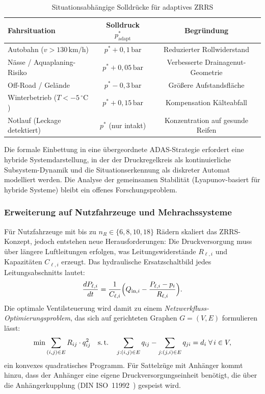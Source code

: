 ﻿\documentclass[a4paper,12pt]{article}
\theoremstyle{definition}
\begin{document}
\begin{table}[H]
\centering
\caption{Situationsabhängige Solldrücke für adaptives ZRRS}
\label{tab:adaptive_druck}
\begin{tabular}{lcc}
\toprule
\textbf{Fahrsituation} & \textbf{Solldruck $p^*_{\text{adapt}}$} & \textbf{Begründung} \\
\midrule
Autobahn ($v > 130\,\text{km/h}$) & $p^* + 0{,}1\,\text{bar}$ & Reduzierter Rollwiderstand \\
Nässe / Aquaplaning-Risiko & $p^* + 0{,}05\,\text{bar}$ & Verbesserte Drainagenut-Geometrie \\
Off-Road / Gelände & $p^* - 0{,}3\,\text{bar}$ & Größere Aufstandsfläche \\
Winterbetrieb ($T < -5\,^\circ\mathrm{C}$) & $p^* + 0{,}15\,\text{bar}$ & Kompensation Kälteabfall \\
Notlauf (Leckage detektiert) & $p^*$ (nur intakt) & Konzentration auf gesunde Reifen \\
\bottomrule
\end{tabular}
\end{table}

Die formale Einbettung in eine übergeordnete ADAS-Strategie erfordert eine
hybride Systemdarstellung, in der der Druckregelkreis als kontinuierliche
Subsystem-Dynamik und die Situationserkennung als diskreter Automat modelliert
werden. Die Analyse der gemeinsamen Stabilität (Lyapunov-basiert für hybride
Systeme) bleibt ein offenes Forschungsproblem.

\subsubsection{Erweiterung auf Nutzfahrzeuge und Mehrachssysteme}

Für Nutzfahrzeuge mit bis zu $n_R \in \{6, 8, 10, 18\}$ Rädern skaliert
das ZRRS-Konzept, jedoch entstehen neue Herausforderungen: Die Druckversorgung
muss über längere Luftleitungen erfolgen, was Leitungswiderstände
$R_{\ell,i}$ und Kapazitäten $C_{\ell,i}$ erzeugt. Das hydraulische
Ersatzschaltbild jedes Leitungsabschnitts lautet:
\[
    \frac{d P_{\ell,i}}{dt} = \frac{1}{C_{\ell,i}}\Bigl(Q_{\text{in},i}
    - \frac{P_{\ell,i} - p_i}{R_{\ell,i}}\Bigr).
\]
Die optimale Ventilsteuerung wird damit zu einem
\emph{Netzwerkfluss-Optimierungsproblem}, das sich auf gerichteten Graphen
$G = (V, E)$ formulieren lässt:
\[
    \min \sum_{(i,j)\in E} R_{ij} \cdot q_{ij}^2
    \quad \text{s.\,t.} \quad
    \sum_{j: (i,j)\in E} q_{ij} - \sum_{j:(j,i)\in E} q_{ji} = d_i
    \;\forall\, i \in V,
\]
ein konvexes quadratisches Programm. Für Sattelzüge mit Anhänger kommt
hinzu, dass der Anhänger eine eigene Druckversorgungseinheit benötigt, die
über die Anhängerkupplung (DIN ISO~11992~\cite{iso11992}) gespeist wird.
\end{document}
